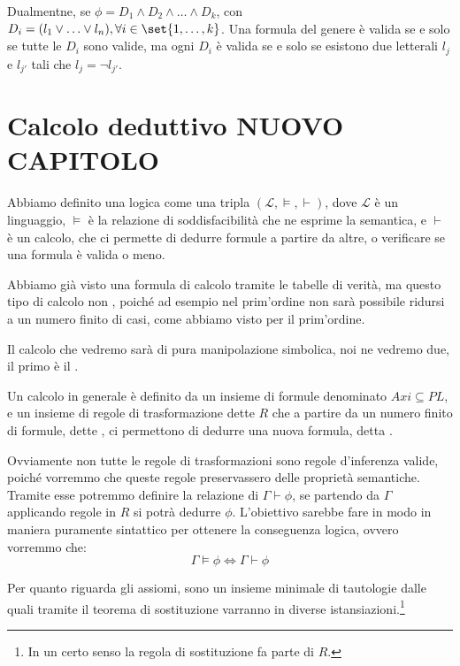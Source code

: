 Dualmentne, se \(\phi = D_1 \land D_2 \land\ldots\land D_k\), con \(D_i = (l_1 \lor \ldots \lor l_n), \forall i \in \set{1,\ldots, k}\). Una formula del genere è valida se e solo se tutte le \(D_i\) sono valide, ma ogni \(D_i\) è valida se e solo se esistono due letterali \(l_j\) e \(l_{j'}\) tali che \(l_j = \neg l_{j'}\).

\section{Calcolo deduttivo NUOVO CAPITOLO}

Abbiamo definito una logica come una tripla \((\mathcal{L}, \models, \vdash)\), dove \(\mathcal{L}\) è un linguaggio, \(\models\) è la relazione di soddisfacibilità che ne esprime la semantica, e \(\vdash\) è un calcolo, che ci permette di dedurre formule a partire da altre, o verificare se una formula è valida o meno.

Abbiamo già visto una formula di calcolo tramite le tabelle di verità, ma questo tipo di calcolo non , poiché ad esempio nel prim'ordine non sarà possibile ridursi a un numero finito di casi, come abbiamo visto per il prim'ordine.

Il calcolo che vedremo sarà di pura manipolazione simbolica, noi ne vedremo due, il primo è il .

Un calcolo in generale è definito da un insieme di formule denominato  \(Axi \subseteq PL\),  e un insieme di regole di trasformazione dette  \(R\) che a partire da un numero finito di formule, dette , ci permettono di dedurre una nuova formula, detta .

Ovviamente non tutte le regole di trasformazioni sono regole d'inferenza valide, poiché vorremmo che queste regole preservassero delle proprietà semantiche. Tramite esse potremmo definire la relazione di  \(\Gamma \vdash \phi\), se partendo da \(\Gamma\) applicando regole in \(R\) si potrà dedurre \(\phi\). L'obiettivo sarebbe fare in modo in maniera puramente sintattico per ottenere la conseguenza logica, ovvero vorremmo che:
\[\Gamma \models \phi \iff \Gamma \vdash \phi\]

Per quanto riguarda gli assiomi, sono un insieme minimale di tautologie dalle quali tramite il teorema di sostituzione varranno in diverse istansiazioni.\footnote{In un certo senso la regola di sostituzione fa parte di \(R\).}

